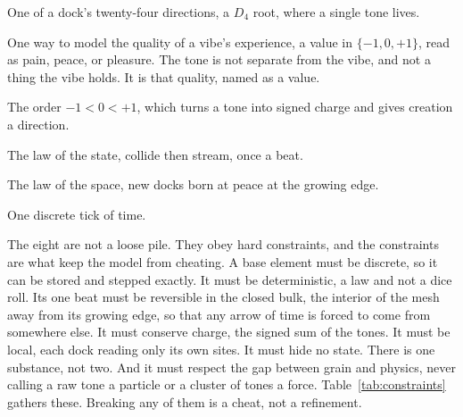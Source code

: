 \begin{definition}[Site]
One of a dock's twenty-four directions, a $D_4$ root, where a single tone lives.
\end{definition}

\begin{definition}[Tone]
One way to model the quality of a vibe's experience, a value in $\{-1, 0, +1\}$, read as pain, peace, or pleasure. The tone is not separate from the vibe, and not a thing the vibe holds. It is that quality, named as a value.
\end{definition}

\begin{definition}[Lean]
The order $-1 < 0 < +1$, which turns a tone into signed charge and gives creation a direction.
\end{definition}

\begin{definition}[Knit]
The law of the state, collide then stream, once a beat.
\end{definition}

\begin{definition}[Wake]
The law of the space, new docks born at peace at the growing edge.
\end{definition}

\begin{definition}[Beat]
One discrete tick of time.
\end{definition}

The eight are not a loose pile. They obey hard constraints, and the constraints are what keep the model from cheating. A base element must be discrete, so it can be stored and stepped exactly. It must be deterministic, a law and not a dice roll. Its one beat must be reversible in the closed bulk, the interior of the mesh away from its growing edge, so that any arrow of time is forced to come from somewhere else. It must conserve charge, the signed sum of the tones. It must be local, each dock reading only its own sites. It must hide no state. There is one substance, not two. And it must respect the gap between grain and physics, never calling a raw tone a particle or a cluster of tones a force. Table~\ref{tab:constraints} gathers these. Breaking any of them is a cheat, not a refinement.

